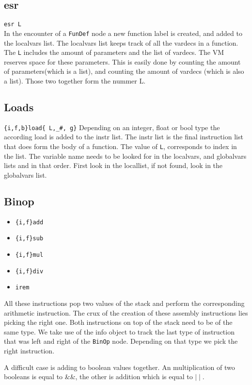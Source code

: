 \documentclass[a4paper]{article}
\begin{document}
\subsection{esr}
\texttt{esr L} \\
In the encounter of a \texttt{FunDef} node a new function label is created, and
added to the localvars list. The localvars list keeps track of all the vardecs
in a function. The \texttt{L} includes the amount of parameters and the list of
vardecs. The VM reserves space for these parameters. This is easily done by
counting the amount of parameters(which is a list), and counting the amount of
vardecs (which is also a list). Those two together form the nummer L.

\subsection{Loads}
\texttt{\{i,f,b\}load\{ L,\_\#, g\}}
Depending on an integer, float or bool type the according load is added to the
instr list. The instr list is the final instruction list that does form the
body of a function. The value of \texttt{L}, corresponds to index in the list.
The variable name needs to be looked for in the localvars, and globalvars
lists and in that order. First look in the locallist, if not found, look in the
globalvars list.

\subsection{Binop}
\begin{itemize}
\item \texttt{\{i,f\}add}
\item \texttt{\{i,f\}sub}
\item \texttt{\{i,f\}mul}
\item \texttt{\{i,f\}div}
\item \texttt{irem}
\end{itemize}
All these instructions pop two values of the stack and perform the
corresponding arithmetic instruction. The crux of the creation of these
assembly instructions lies picking the right one. Both instructions on top of
the stack need to be of the same type. We take use of the info object to track
the last type of instruction that was left and right of the \texttt{BinOp}
node. Depending on that type we pick the right instruction.

A difficult case is adding to boolean values together. An multiplication of two
booleans is equal to \&\&, the other is addition which is equal to $\mid\mid$.
\end{document}
